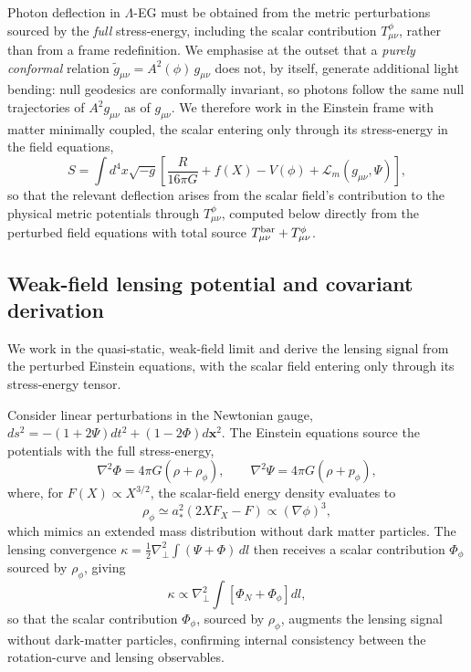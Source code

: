 \documentclass[11pt,a4paper]{article}
\begin{document}
Photon deflection in $\Lambda$-EG must be obtained from the metric perturbations sourced
by the \emph{full} stress-energy, including the scalar contribution $T^\phi_{\mu\nu}$,
rather than from a frame redefinition. We emphasise at the outset that a \emph{purely
conformal} relation $\tilde{g}_{\mu\nu} = A^2(\phi)\,g_{\mu\nu}$ does not, by itself,
generate additional light bending: null geodesics are conformally invariant, so photons
follow the same null trajectories of $A^2 g_{\mu\nu}$ as of $g_{\mu\nu}$. We therefore
work in the Einstein frame with matter minimally coupled, the scalar entering only through
its stress-energy in the field equations,
\begin{equation}
  S = \int d^4x\sqrt{-g}\left[\frac{R}{16\pi G} + f(X) - V(\phi)
  + \mathcal{L}_m(g_{\mu\nu},\Psi)\right],
  \label{eq:action_lensing}
\end{equation}
so that the relevant deflection arises from the scalar field's contribution to the
physical metric potentials through $T^\phi_{\mu\nu}$, computed below directly from the
perturbed field equations with total source $T^{\rm bar}_{\mu\nu} + T^\phi_{\mu\nu}$.

\subsection{Weak-field lensing potential and covariant derivation}
\label{subsec:lensing_WF}

We work in the quasi-static, weak-field limit and derive the lensing signal
from the perturbed Einstein equations, with the scalar field entering only through its
stress-energy tensor.

Consider linear perturbations in the Newtonian gauge,
$ds^2 = -(1+2\Psi)dt^2 + (1-2\Phi)d\mathbf{x}^2$.
The Einstein equations source the potentials with the full stress-energy,
\begin{equation}
  \nabla^2 \Phi = 4\pi G(\rho + \rho_\phi),
  \qquad
  \nabla^2 \Psi = 4\pi G(\rho + p_\phi),
\end{equation}
where, for $F(X)\propto X^{3/2}$, the scalar-field energy density evaluates to
\begin{equation}
  \rho_\phi \simeq a_*^2(2XF_X - F) \propto (\nabla\phi)^3,
\end{equation}
which mimics an extended mass distribution without dark matter particles.
The lensing convergence $\kappa = \tfrac{1}{2}\nabla_\perp^2\int(\Psi+\Phi)\,dl$
then receives a scalar contribution $\Phi_\phi$ sourced by $\rho_\phi$, giving
\begin{equation}
  \kappa \propto \nabla_\perp^2\int\!\left[\Phi_N + \Phi_\phi\right]dl,
\end{equation}
so that the scalar contribution $\Phi_\phi$, sourced by $\rho_\phi$, augments the
lensing signal without dark-matter particles, confirming internal consistency between
the rotation-curve and lensing observables.
\end{document}
